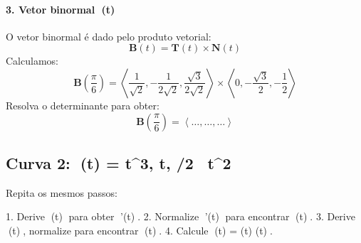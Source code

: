 \documentclass[a4paper,12pt]{article}
\begin{document}
\paragraph{3. Vetor binormal (t)}
O vetor binormal é dado pelo produto vetorial:
\[
\mathbf{B}(t) = \mathbf{T}(t) \times \mathbf{N}(t)
\]
Calculamos:
\[
\mathbf{B}\left(\frac{\pi}{6}\right) = \left\langle \frac{1}{\sqrt{2}}, -\frac{1}{2\sqrt{2}}, \frac{\sqrt{3}}{2\sqrt{2}} \right\rangle \times \left\langle 0, -\frac{\sqrt{3}}{2}, -\frac{1}{2} \right\rangle
\]
Resolva o determinante para obter:
\[
\mathbf{B}\left(\frac{\pi}{6}\right) = \left\langle \dots, \dots, \dots \right\rangle
\]

\subsection*{Curva 2: (t) = \langle t^3, t, /2 \, t^2 \rangle}
Repita os mesmos passos:

1. Derive (t) para obter '(t).
2. Normalize '(t) para encontrar (t).
3. Derive (t), normalize para encontrar (t).
4. Calcule (t) = (t) \times {}(t).
\end{document}

